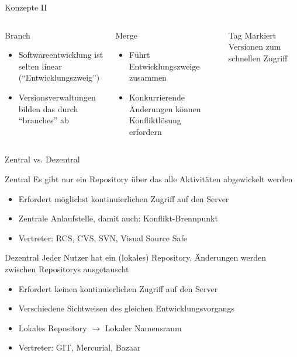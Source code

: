 \documentclass[18pt]{beamer}
\begin{document}
\begin{frame}{Konzepte II}
\begin{columns}
			\begin{block}{Branch}
				\begin{itemize}
					\item Softwareentwicklung ist selten linear (\enquote{Entwicklungszweig})
					\item Versionsverwaltungen bilden das durch \enquote{branches} ab
				\end{itemize}
			\end{block}
			\begin{block}{Merge}
				\begin{itemize}
					\item Führt Entwicklungszweige zusammen
					\item Konkurrierende Änderungen können Konfliktlösung erfordern
				\end{itemize}
			\end{block}
			\begin{block}{Tag}
				Markiert Versionen zum schnellen Zugriff
			\end{block}
	\end{columns}
\end{frame}

\begin{frame}{Zentral vs. Dezentral}
	\begin{block}{Zentral}
		Es gibt nur ein Repository über das alle Aktivitäten abgewickelt werden
		\begin{itemize}
			\item Erfordert möglichst kontinuierlichen Zugriff auf den Server
			\item Zentrale Anlaufstelle, damit auch: Konflikt-Brennpunkt
			\item Vertreter: RCS, CVS, SVN, Visual Source Safe
		\end{itemize}
	\end{block}
	\begin{block}{Dezentral}
		Jeder Nutzer hat ein (lokales) Repository, Änderungen werden zwischen Repositorys ausgetauscht
		\begin{itemize}
			\item Erfordert keinen kontinuierlichen Zugriff auf den Server
			\item Verschiedene Sichtweisen des gleichen Entwicklungsvorgangs
			\item Lokales Repository $\rightarrow$ Lokaler Namensraum
			\item Vertreter: GIT, Mercurial, Bazaar
		\end{itemize}
	\end{block}
\end{frame}
\end{document}
